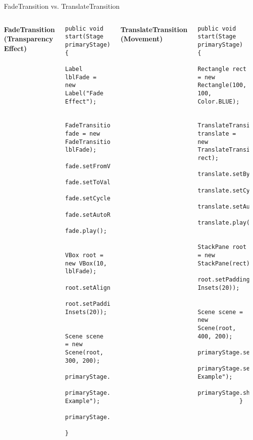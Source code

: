\documentclass[aspectratio=169, table]{beamer}
\begin{document}
\begin{frame}[fragile]{FadeTransition vs. TranslateTransition}
	\vspace{30pt}
	\begin{columns}[t]
		\textbf{FadeTransition (Transparency Effect)}  
		\begin{lstlisting}[style=JavaStyle]
			public void start(Stage primaryStage) {
				Label lblFade = new Label("Fade Effect");
				
				FadeTransition fade = new FadeTransition(Duration.seconds(2), lblFade);
				fade.setFromValue(1.0);
				fade.setToValue(0.1);
				fade.setCycleCount(Timeline.INDEFINITE);
				fade.setAutoReverse(true);
				fade.play();
				
				VBox root = new VBox(10, lblFade);
				root.setAlignment(Pos.CENTER);
				root.setPadding(new Insets(20));
				
				Scene scene = new Scene(root, 300, 200);
				primaryStage.setScene(scene);
				primaryStage.setTitle("FadeTransition Example");
				primaryStage.show();
			}
		\end{lstlisting}
		
		\textbf{TranslateTransition (Movement)}  
		\begin{lstlisting}[style=JavaStyle]
			public void start(Stage primaryStage) {
				Rectangle rect = new Rectangle(100, 100, Color.BLUE);
				
				TranslateTransition translate = new TranslateTransition(Duration.seconds(2), rect);
				translate.setByX(200);
				translate.setCycleCount(Timeline.INDEFINITE);
				translate.setAutoReverse(true);
				translate.play();
				
				StackPane root = new StackPane(rect);
				root.setPadding(new Insets(20));
				
				Scene scene = new Scene(root, 400, 200);
				primaryStage.setScene(scene);
				primaryStage.setTitle("TranslateTransition Example");
				primaryStage.show();
			}
		\end{lstlisting}
	\end{columns}
\end{frame}
\end{document}
